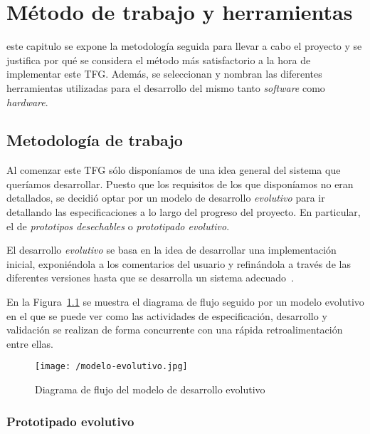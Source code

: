 \chapter{Método de trabajo y herramientas}
\label{chap:metodo}

 este capitulo se expone la metodología seguida para llevar a cabo el proyecto y se
justifica por qué se considera el método más satisfactorio a la hora de implementar este
\acs{TFG}. Además, se seleccionan y nombran las diferentes herramientas utilizadas para el
desarrollo del mismo tanto \emph{software} como \emph{hardware}.

\section{Metodología de trabajo}
\label{sec:metodologia}

Al comenzar este \acs{TFG} sólo disponíamos de una idea general del sistema que queríamos
desarrollar. Puesto que los requisitos de los que disponíamos no eran detallados, se decidió optar
por un modelo de desarrollo \emph{evolutivo} para ir detallando las especificaciones a lo largo del
progreso del proyecto. En particular, el de \emph{prototipos desechables} o \emph{prototipado
  evolutivo}.

El desarrollo \emph{evolutivo} se basa en la idea de desarrollar una implementación inicial,
exponiéndola a los comentarios del usuario y refinándola a través de las diferentes versiones hasta
que se desarrolla un sistema adecuado~\cite{Sommerville14}.

En la Figura~\ref{fig:modelo-evolutivo} se muestra el diagrama de flujo seguido por un modelo
evolutivo en el que se puede ver como las actividades de especificación, desarrollo y validación se
realizan de forma concurrente con una rápida retroalimentación entre ellas.

\begin{figure}[!h]
  \begin{center}
    \texttt{[image: /modelo-evolutivo.jpg]}
    \caption{Diagrama de flujo del modelo de desarrollo evolutivo}
    \label{fig:modelo-evolutivo}
  \end{center}
\end{figure}

\subsection{Prototipado evolutivo}

